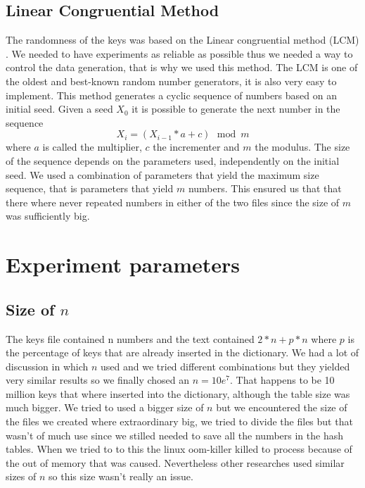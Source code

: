 \documentclass{article}
\begin{document}
		\subsection*{Linear Congruential Method}
		The randomness of the keys was based on the Linear congruential method (LCM) \cite{BOOK:2}. 
		We needed to have experiments as reliable as possible thus we needed a way to control the data generation, 
		that is why we used this method. The LCM is one of the oldest and best-known random number generators, 
		it is also very easy to implement. This method generates a cyclic sequence of numbers based on an initial seed. 
		Given a seed $X_0$ it is possible to generate the next number in the sequence 
		\begin{equation}
		X_i = (X_{i-1} * a + c) \, \bmod m
		\end{equation}
		 where $a$ is called the multiplier, $c$ the incrementer and $m$ the modulus. 
		 The size of the sequence depends on the parameters used, independently on the initial seed.
		  We used a combination of parameters that yield the maximum size sequence, that is parameters that yield $m$ numbers.  
		  This ensured us that that there where never repeated numbers in either of the two files since the size of $m$ was
		  sufficiently big. 
		  
		   
    \section{Experiment parameters}
    \subsection*{Size of $n$}
		   The keys file contained n numbers and the text contained $2 * n + p * n$ where $p$ is the percentage of keys that are already inserted in the dictionary. 
		   We had a lot of discussion in which $n$ used and we tried different combinations but they yielded very similar results so we finally chosed an $n=10e^7$. 
		   That happens to be 10 million keys that where inserted into the dictionary, although the table size was much bigger. We tried to used a bigger size of $n$
		   but we encountered the size of the files we created where extraordinary big, we tried to divide the files but that wasn't of much use since we stilled needed to 
		   save all the numbers in the hash tables. When we tried to to this the linux oom-killer killed to process because of the out of memory that was caused. Nevertheless 
		   other researches \cite{ARTICLE:2} used similar sizes of $n$ so this size wasn't really an issue. 
\end{document}
